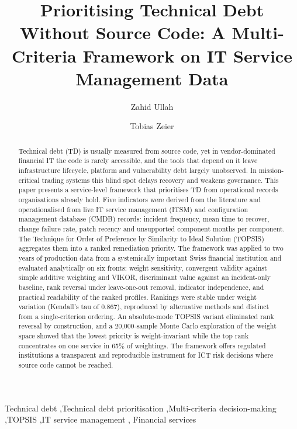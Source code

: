 \documentclass[
  authoryear,
  preprint]{elsarticle}
\begin{document}
\begin{frontmatter}
\title{Prioritising Technical Debt Without Source Code: A Multi-Criteria
Framework on IT Service Management Data}
\author[1]{Zahid Ullah%
%
}
\author[1]{Tobias Zeier%
%
}



        
\begin{abstract}
Technical debt (TD) is usually measured from source code, yet in
vendor-dominated financial IT the code is rarely accessible, and the
tools that depend on it leave infrastructure lifecycle, platform and
vulnerability debt largely unobserved. In mission-critical trading
systems this blind spot delays recovery and weakens governance. This
paper presents a service-level framework that prioritises TD from
operational records organisations already hold. Five indicators were
derived from the literature and operationalised from live IT service
management (ITSM) and configuration management database (CMDB) records:
incident frequency, mean time to recover, change failure rate, patch
recency and unsupported component months per component. The Technique
for Order of Preference by Similarity to Ideal Solution (TOPSIS)
aggregates them into a ranked remediation priority. The framework was
applied to two years of production data from a systemically important
Swiss financial institution and evaluated analytically on six fronts:
weight sensitivity, convergent validity against simple additive
weighting and VIKOR, discriminant value against an incident-only
baseline, rank reversal under leave-one-out removal, indicator
independence, and practical readability of the ranked profiles. Rankings
were stable under weight variation (Kendall's tau of 0.867), reproduced
by alternative methods and distinct from a single-criterion ordering. An
absolute-mode TOPSIS variant eliminated rank reversal by construction,
and a 20,000-sample Monte Carlo exploration of the weight space showed
that the lowest priority is weight-invariant while the top rank
concentrates on one service in 65\% of weightings. The framework offers
regulated institutions a transparent and reproducible instrument for ICT
risk decisions where source code cannot be reached.
\end{abstract}





\begin{keyword}
    Technical debt \sep Technical debt
prioritisation \sep Multi-criteria decision-making \sep TOPSIS \sep IT
service management \sep 
    Financial services
\end{keyword}
\end{frontmatter}
    
\end{document}
